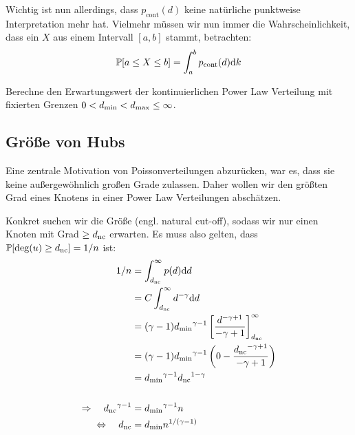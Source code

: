 Wichtig ist nun allerdings, dass $p_\text{cont}(d)$ keine natürliche punktweise Interpretation mehr hat.
Vielmehr müssen wir nun immer die Wahrscheinlichkeit, dass ein $X$ aus einem Intervall $[a, b]$ stammt, betrachten:
\begin{align}
    \mathbb{P}\!\left[a \le X \le b\right] = \int_{a}^b p_\text{cont}(d) \text d k
\end{align}

\begin{exercise}
    Berechne den Erwartungswert der kontinuierlichen Power Law Verteilung mit fixierten Grenzen $0 < {d_{\text{min}}} < {d_{\text{max}}} \le \infty$.
\end{exercise}

\subsection{Größe von Hubs}\label{subsec:groesse_von_hubs}
Eine zentrale Motivation von Poissonverteilungen abzurücken, war es, dass sie keine außergewöhnlich großen Grade zulassen.
Daher wollen wir den größten Grad eines Knotens in einer Power Law Verteilungen abschätzen.

Konkret suchen wir die Größe \dnc{} (engl. natural cut-off), sodass wir nur einen Knoten mit Grad $\ge {d_{\text{nc}}}$ erwarten.
Es muss also gelten, dass $\mathbb{P}\!\left[\deg(u) \ge {d_{\text{nc}}}\right] = 1 / n$ ist:
\begin{align}
    1/n                                & = \int_{{d_{\text{nc}}}}^\infty p(d) \text d d                                                               \\
                                       & = C \int_{{d_{\text{nc}}}}^\infty d^{-\gamma} \text d d                                                      \\
                                       & = (\gamma-1) {d_{\text{min}}}^{\gamma - 1} \left[ \frac{d^{-\gamma + 1}}{-\gamma +1} \right]_{{d_{\text{nc}}}}^\infty \\
                                       & = (\gamma-1) {d_{\text{min}}}^{\gamma - 1} \left( 0 - \frac{{d_{\text{nc}}}^{-\gamma + 1}}{-\gamma +1} \right)      \\
                                       & = {d_{\text{min}}}^{\gamma - 1} {d_{\text{nc}}}^{1 - \gamma}                                                        \\
    \nonumber                                                                                                                          \\
    \Rightarrow\quad {d_{\text{nc}}}^{\gamma - 1} & = {d_{\text{min}}}^{\gamma - 1} n                                                                        \\
    \Leftrightarrow\quad {d_{\text{nc}}}          & = {d_{\text{min}}} n^{1/(\gamma - 1)}
\end{align}

